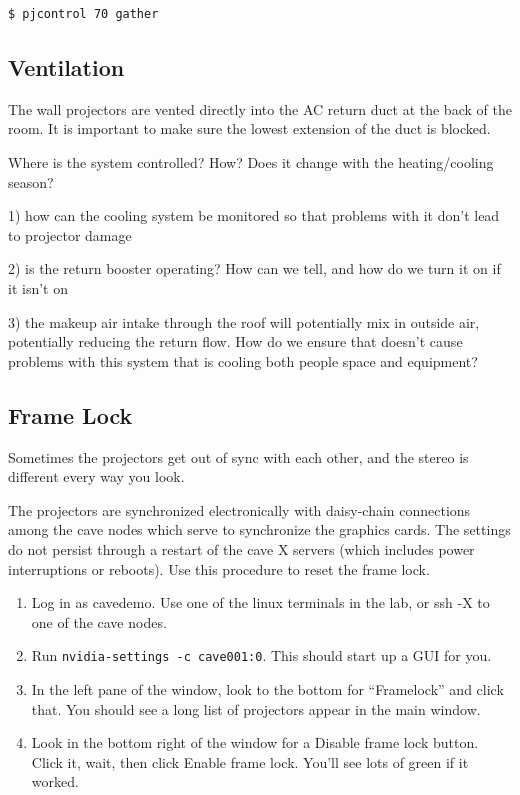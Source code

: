 \documentclass[11pt]{article}
\newcommand{\cmd}[1]{\texttt{#1}\xspace}
\newcommand{\menu}[1]{``#1''\xspace}
\newcommand{\button}[1]{\textsf{#1}\xspace}
\begin{document}
\begin{verbatim}
$ pjcontrol 70 gather
\end{verbatim}




\subsection{Ventilation}

The wall projectors are vented directly into the AC return duct at the
back of the room.  It is important to make sure the lowest extension
of the duct is blocked.

Where is the system controlled?  How?  Does it change with the
heating/cooling season?

1) how can the cooling system be monitored so that problems with it
don’t lead to projector damage

2) is the return booster operating?  How can we tell, and how do we
turn it on if it isn’t on

3) the makeup air intake through the roof will potentially mix in
outside air, potentially reducing the return flow.  How do we ensure
that doesn’t cause problems with this system that is cooling both
people space and equipment?


\subsection{Frame Lock}
\label{framelock}

Sometimes the projectors get out of sync with each other, and the
stereo is different every way you look.

The projectors are synchronized electronically with daisy-chain
connections among the cave nodes which serve to synchronize the
graphics cards.  The settings do not persist through a restart of the
cave X servers (which includes power interruptions or reboots).  Use
this procedure to reset the frame lock.

\begin{enumerate}

\item Log in as cavedemo.  Use one of the linux terminals in the lab,
  or ssh -X to one of the cave nodes.

\item Run \cmd{nvidia-settings -c cave001:0}.  This should start up
  a GUI for you.

\item In the left pane of the window, look to the bottom for
  \menu{Framelock} and click that.  You should see a long list of
  projectors appear in the main window.

\item Look in the bottom right of the window for a \button{Disable frame
  lock} button.  Click it, wait, then click \button{Enable frame lock}.
  You'll see lots of green if it worked.

\end{enumerate}
\end{document}
